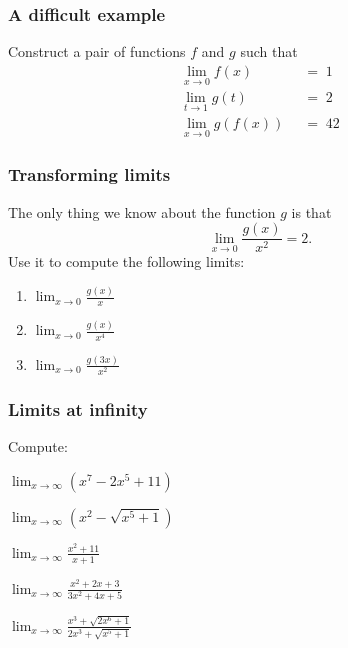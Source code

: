 \begin{frame}
	\frametitle{A difficult example}

	Construct a pair of functions $f$ and $g$ such that
	\begin{align*}
		\lim_{x \to 0}f(x) \;    & \; = \; 1  \\
		\lim_{t \to 1}g(t) \;    & \; = \; 2  \\
		\lim_{x \to 0}g(f(x)) \; & \; = \; 42
	\end{align*}
\end{frame}

\begin{frame}
	\frametitle{Transforming limits}

	The only thing we know about the function $g$ is that
	\[
		\lim_{x \to 0}\frac{g(x)}{x^{2}}= 2.
	\]
	Use it to compute the following limits:

	\begin{multicols}{2}
		\begin{enumerate}
			\item $\displaystyle \lim_{x \to 0}\frac{g(x)}{x}$

			\item $\displaystyle \lim_{x \to 0}\frac{g(x)}{x^{4}}$

			\item $\displaystyle \lim_{x \to 0}\frac{g(3x)}{x^{2}}$
		\end{enumerate}
	\end{multicols}
\end{frame}

\begin{frame}
	\frametitle{Limits at infinity}

	Compute:

	\begin{enumerate}
	\end{enumerate}
\end{frame}

